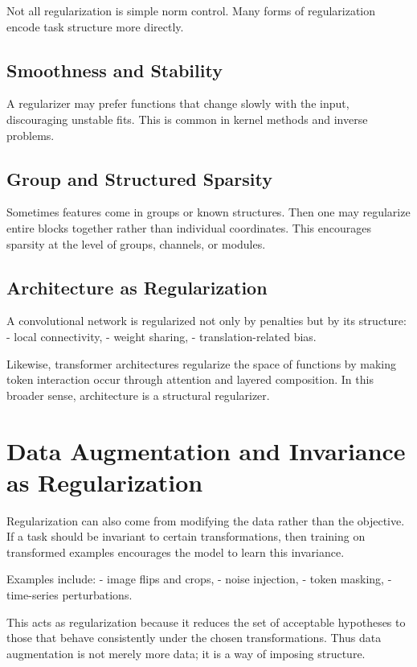 Not all regularization is simple norm control. Many forms of regularization encode task structure more directly.

\subsection{Smoothness and Stability}

A regularizer may prefer functions that change slowly with the input, discouraging unstable fits. This is common in kernel methods and inverse problems.

\subsection{Group and Structured Sparsity}

Sometimes features come in groups or known structures. Then one may regularize entire blocks together rather than individual coordinates. This encourages sparsity at the level of groups, channels, or modules.

\subsection{Architecture as Regularization}

A convolutional network is regularized not only by penalties but by its structure:
- local connectivity,
- weight sharing,
- translation-related bias.

Likewise, transformer architectures regularize the space of functions by making token interaction occur through attention and layered composition. In this broader sense, architecture is a structural regularizer.

\section{Data Augmentation and Invariance as Regularization}

Regularization can also come from modifying the data rather than the objective. If a task should be invariant to certain transformations, then training on transformed examples encourages the model to learn this invariance.

Examples include:
- image flips and crops,
- noise injection,
- token masking,
- time-series perturbations.

This acts as regularization because it reduces the set of acceptable hypotheses to those that behave consistently under the chosen transformations. Thus data augmentation is not merely more data; it is a way of imposing structure.

